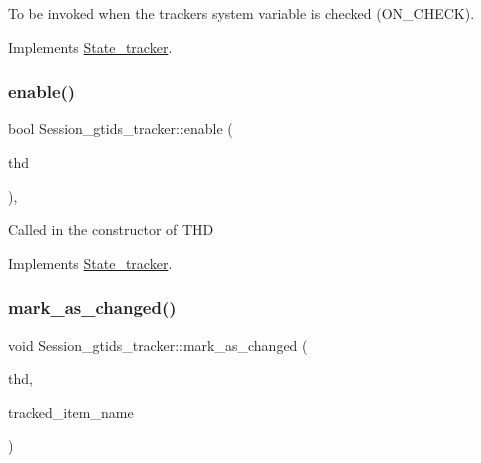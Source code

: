 To be invoked when the tracker\textquotesingle{}s system variable is checked (O\+N\+\_\+\+C\+H\+E\+CK). 

Implements \mbox{\hyperlink{classState__tracker_a50923266a6300e657b70dc4f0125782c}{State\+\_\+tracker}}.

\mbox{\label{classSession__gtids__tracker_a170e0e7c09b4a143c7f3f6e710b435ce}} 
\subsubsection{\texorpdfstring{enable()}{enable()}}
{\footnotesize\ttfamily bool Session\+\_\+gtids\+\_\+tracker\+::enable (\begin{DoxyParamCaption}\item[{T\+HD $\ast$}]{thd }\end{DoxyParamCaption})\hspace{0.3cm}{\ttfamily [inline]}, {\ttfamily [virtual]}}

Called in the constructor of T\+HD 

Implements \mbox{\hyperlink{classState__tracker_a65cd4b0d77f079f4c41620c0bf314939}{State\+\_\+tracker}}.

\mbox{\label{classSession__gtids__tracker_a2c2c7bed399a66fda5748d1a6407b8f8}} 
\subsubsection{\texorpdfstring{mark\+\_\+as\+\_\+changed()}{mark\_as\_changed()}}
{\footnotesize\ttfamily void Session\+\_\+gtids\+\_\+tracker\+::mark\+\_\+as\+\_\+changed (\begin{DoxyParamCaption}\item[{T\+HD $\ast$}]{thd,  }\item[{L\+E\+X\+\_\+\+C\+S\+T\+R\+I\+NG $\ast$}]{tracked\+\_\+item\+\_\+name }\end{DoxyParamCaption})\hspace{0.3cm}{\ttfamily [virtual]}}



